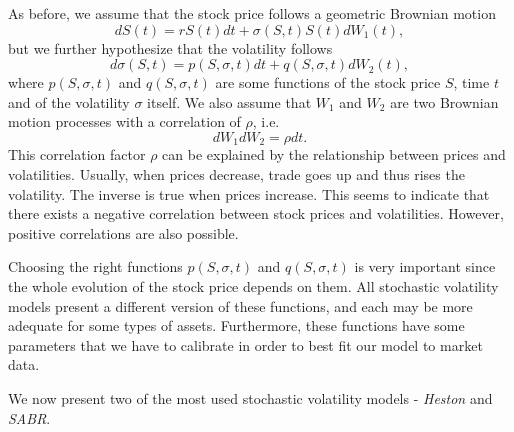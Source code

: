 As before, we assume that the stock price follows a geometric Brownian motion
\begin{equation}\label{stochvol}
dS(t)=rS(t)dt+\sigma(S,t)S(t)dW_1(t),
\end{equation}
\noindent but we further hypothesize that the volatility follows
\begin{equation}
d\sigma(S,t)=p(S,\sigma,t)dt+q(S,\sigma,t)dW_2(t),
\end{equation}
\noindent where $p(S,\sigma,t)$ and $q(S,\sigma,t)$ are some functions of the stock price $S$, time $t$ and of the volatility $\sigma$ itself. We also assume that $W_1$ and $W_2$ are two Brownian motion processes with a correlation of $\rho$, i.e.
\begin{equation}
dW_1dW_2=\rho dt.
\end{equation}
\noindent This correlation factor $\rho$ can be explained by the relationship between prices and volatilities. Usually, when prices decrease, trade goes up and thus rises the volatility. The inverse is true when prices increase. This seems to indicate that there exists a negative correlation between stock prices and volatilities. However, positive correlations are also possible.

\iffalse
\hl{This correlation can be explained by the relationship between prices and volatilities.} As an example, we can consider a stock that costs \textdollar100 and changes by \textdollar0.10 daily. We can estimate, even without calculations, that it is very stable and thus has a low volatility.
On the other hand if another stock costs \textdollar1 and changes by \textdollar0.10 in a day, we can see that it is extremely volatile even though it changed by the same amount as the first. With this example, we can see that the volatility has some correlation with the stock price.
\fi

Choosing the right functions $p(S,\sigma,t)$ and $q(S,\sigma,t)$ is very important since the whole evolution of the stock price depends on them. All stochastic volatility models present a different version of these functions, and each may be more adequate for some types of assets. Furthermore, these functions have some parameters that we have to calibrate in order to best fit our model to market data.

We now present two of the most used stochastic volatility models - \emph{Heston} and \emph{SABR}.



